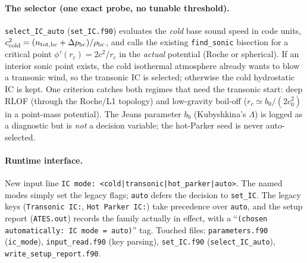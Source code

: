 \documentclass[english,a4paper]{kiseon_memo}
\begin{document}
\paragraph{The selector (one exact probe, no tunable threshold).}
\texttt{select\_IC\_auto} (\texttt{set\_IC.f90}) evaluates the \emph{cold} base
sound speed in code units,
$c^2_{\rm cold} = (n_{\rm tot,bc}+\Delta p_{\rm bc})/\rho_{\rm bc}$, and calls
the existing \texttt{find\_sonic} bisection for a critical point
$\phi'(r_c) = 2c^2/r_c$ in the \emph{actual} potential (Roche or spherical).
If an interior sonic point exists, the cold isothermal atmosphere already wants
to blow a transonic wind, so the transonic IC is selected; otherwise the cold
hydrostatic IC is kept. One criterion catches both regimes that need the
transonic start: deep RLOF (through the Roche/L1 topology) and low-gravity
boil-off ($r_c \simeq b_0/(2c_0^2)$ in a point-mass potential). The Jeans
parameter $b_0$ (Kubyshkina's $\Lambda$) is logged as a diagnostic but is
\emph{not} a decision variable; the hot-Parker seed is never auto-selected.

\paragraph{Runtime interface.} New input line
\texttt{IC mode: <cold|transonic|hot\_parker|auto>}. The named modes simply set
the legacy flags; \texttt{auto} defers the decision to \texttt{set\_IC}. The
legacy keys (\texttt{Transonic IC:}, \texttt{Hot Parker IC:}) take precedence
over \texttt{auto}, and the setup report (\texttt{ATES.out}) records the family
actually in effect, with a ``\texttt{(chosen automatically: IC mode = auto)}''
tag. Touched files: \texttt{parameters.f90} (\texttt{ic\_mode}),
\texttt{input\_read.f90} (key parsing), \texttt{set\_IC.f90}
(\texttt{select\_IC\_auto}), \texttt{write\_setup\_report.f90}.
\end{document}
